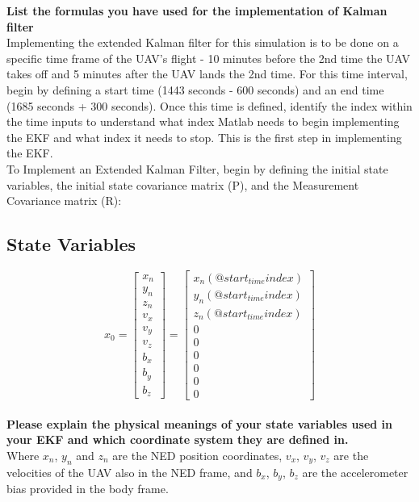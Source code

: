 \textbf{List the formulas you have used for the implementation of Kalman filter}\\

Implementing the extended Kalman filter for this simulation is to be done on a specific time frame of the UAV's flight - 10 minutes before the 2nd time the UAV takes off and 5 minutes after the UAV lands the 2nd time. For this time interval, begin by defining a start time (1443 seconds - 600 seconds) and an end time (1685 seconds + 300 seconds). Once this time is defined, identify the index within the time inputs to understand what index Matlab needs to begin implementing the EKF and what index it needs to stop. This is the first step in implementing the EKF.\\
To Implement an Extended Kalman Filter, begin by defining the initial state variables, the initial state covariance matrix (P), and the Measurement Covariance matrix (R):
\subsection*{State Variables}

\[
x_0 = 
\begin{bmatrix}
x_n \\
y_n \\
z_n \\
v_{x} \\
v_{y} \\
v_{z} \\
b_x \\
b_y \\
b_z
\end{bmatrix}
=
\begin{bmatrix}
x_n (@start_{time} index) \\
y_n (@start_{time} index) \\
z_n (@start_{time} index) \\
0 \\
0 \\
0 \\
0 \\
0 \\
0
\end{bmatrix}
\]\\
\textbf{Please explain the physical meanings of your state variables used in your EKF and which coordinate system they are defined in. }\\

Where $x_n$, $y_n$ and $z_n$ are the NED position coordinates, $v_x$, $v_y$, $v_z$ are the velocities of the UAV also in the NED frame, and $b_x$, $b_y$, $b_z$ are the accelerometer bias provided in the body frame.

